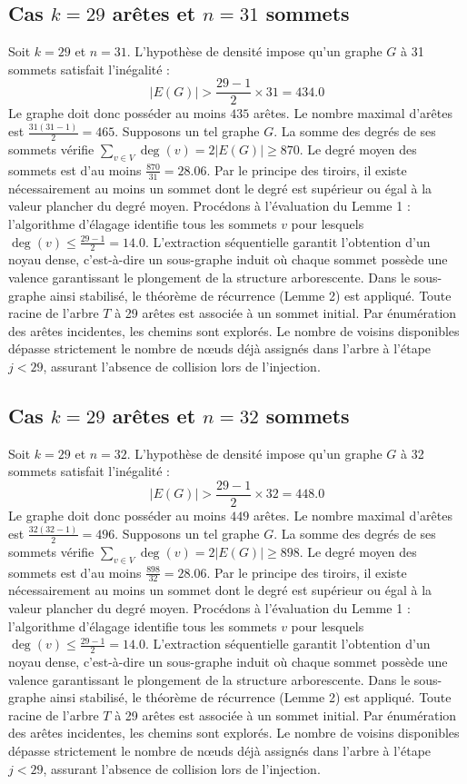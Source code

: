 \documentclass[12pt,a4paper]{article}
\begin{document}
\subsection{Cas $k = 29$ arêtes et $n = 31$ sommets}
Soit $k = 29$ et $n = 31$. L'hypothèse de densité impose qu'un graphe $G$ à 31 sommets satisfait l'inégalité :
$$ |E(G)| > \frac{29-1}{2} \times 31 = 434.0 $$
Le graphe doit donc posséder au moins $435$ arêtes. Le nombre maximal d'arêtes est $\frac{31(31-1)}{2} = 465$.
Supposons un tel graphe $G$. La somme des degrés de ses sommets vérifie $\sum_{v \in V} \deg(v) = 2|E(G)| \geq 870$.
Le degré moyen des sommets est d'au moins $\frac{870}{31} = 28.06$.
Par le principe des tiroirs, il existe nécessairement au moins un sommet dont le degré est supérieur ou égal à la valeur plancher du degré moyen.
Procédons à l'évaluation du Lemme 1 : l'algorithme d'élagage identifie tous les sommets $v$ pour lesquels $\deg(v) \leq \frac{29-1}{2} = 14.0$.
L'extraction séquentielle garantit l'obtention d'un noyau dense, c'est-à-dire un sous-graphe induit où chaque sommet possède une valence garantissant le plongement de la structure arborescente.
Dans le sous-graphe ainsi stabilisé, le théorème de récurrence (Lemme 2) est appliqué. Toute racine de l'arbre $T$ à 29 arêtes est associée à un sommet initial. Par énumération des arêtes incidentes, les chemins sont explorés. Le nombre de voisins disponibles dépasse strictement le nombre de nœuds déjà assignés dans l'arbre à l'étape $j < 29$, assurant l'absence de collision lors de l'injection.

\subsection{Cas $k = 29$ arêtes et $n = 32$ sommets}
Soit $k = 29$ et $n = 32$. L'hypothèse de densité impose qu'un graphe $G$ à 32 sommets satisfait l'inégalité :
$$ |E(G)| > \frac{29-1}{2} \times 32 = 448.0 $$
Le graphe doit donc posséder au moins $449$ arêtes. Le nombre maximal d'arêtes est $\frac{32(32-1)}{2} = 496$.
Supposons un tel graphe $G$. La somme des degrés de ses sommets vérifie $\sum_{v \in V} \deg(v) = 2|E(G)| \geq 898$.
Le degré moyen des sommets est d'au moins $\frac{898}{32} = 28.06$.
Par le principe des tiroirs, il existe nécessairement au moins un sommet dont le degré est supérieur ou égal à la valeur plancher du degré moyen.
Procédons à l'évaluation du Lemme 1 : l'algorithme d'élagage identifie tous les sommets $v$ pour lesquels $\deg(v) \leq \frac{29-1}{2} = 14.0$.
L'extraction séquentielle garantit l'obtention d'un noyau dense, c'est-à-dire un sous-graphe induit où chaque sommet possède une valence garantissant le plongement de la structure arborescente.
Dans le sous-graphe ainsi stabilisé, le théorème de récurrence (Lemme 2) est appliqué. Toute racine de l'arbre $T$ à 29 arêtes est associée à un sommet initial. Par énumération des arêtes incidentes, les chemins sont explorés. Le nombre de voisins disponibles dépasse strictement le nombre de nœuds déjà assignés dans l'arbre à l'étape $j < 29$, assurant l'absence de collision lors de l'injection.
\end{document}
